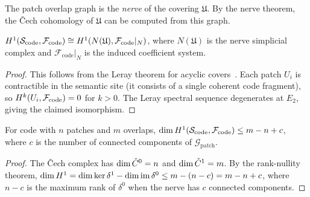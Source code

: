 \documentclass[11pt]{article}
\newcommand{\CodeSheaf}{\mathcal{F}_{\mathrm{code}}}
\newcommand{\CodeSite}{\Site_{\mathrm{code}}}
\newcommand{\PatchGraph}{\mathcal{G}_{\mathrm{patch}}}
\begin{document}
The patch overlap graph is the \emph{nerve} of the covering
$\mathfrak{U}$.  By the nerve theorem, the \v{C}ech cohomology of
$\mathfrak{U}$ can be computed from this graph.

\begin{proposition}\label{prop:nerve}
$\Hcoh{1}(\CodeSite, \CodeSheaf) \cong \Hcoh{1}(N(\mathfrak{U}),
\CodeSheaf|_N)$, where $N(\mathfrak{U})$ is the nerve simplicial
complex and $\CodeSheaf|_N$ is the induced coefficient system.
\end{proposition}

\begin{proof}
This follows from the Leray theorem for acyclic covers~\cite{Godement1958}.
Each patch $U_i$ is contractible in the semantic site (it consists of a
single coherent code fragment), so $\Hcoh{k}(U_i, \CodeSheaf) = 0$ for
$k > 0$.  The Leray spectral sequence degenerates at $E_2$, giving the
claimed isomorphism.
\end{proof}

\begin{lemma}\label{lem:dim-bound}
For code with $n$ patches and $m$ overlaps,
$\dim \Hcoh{1}(\CodeSite, \CodeSheaf) \leq m - n + c$,
where $c$ is the number of connected components of $\PatchGraph$.
\end{lemma}

\begin{proof}
The \v{C}ech complex has $\dim \check{C}^0 = n$ and $\dim \check{C}^1 = m$.
By the rank-nullity theorem,
$\dim H^{1} = \dim \ker \delta^1 - \dim \mathrm{im}\, \delta^0
\leq m - (n - c) = m - n + c$,
where $n - c$ is the maximum rank of $\delta^0$ when the nerve has
$c$ connected components.
\end{proof}
\end{document}
